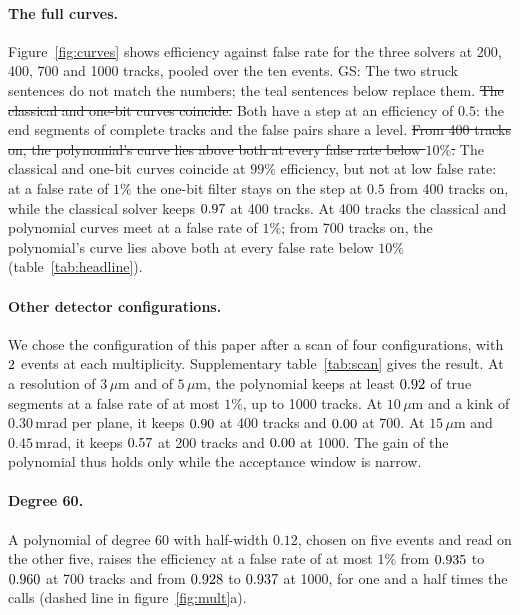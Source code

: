 \documentclass[11pt,a4paper]{article}
\newcommand{\gs}[1]{{\color{orange!85!black} GS: #1 }}
\newcommand{\gss}[1]{{\color{teal} #1}}
\newcommand{\gsx}[1]{{\color{gray}\sout{#1}}}
\begin{document}
\paragraph{The full curves.}
Figure~\ref{fig:curves} shows efficiency against false rate for the three solvers at 200, 400, 700
and 1000 tracks, pooled over the ten events. \gs{The two struck sentences do not match the numbers; the teal sentences below replace them.} \gsx{The classical and one-bit curves coincide.} Both have a
step at an efficiency of $0.5$: the end segments of complete tracks and the false pairs share a
level. \gsx{From 400 tracks on, the polynomial's curve lies above both at every false rate below $10\%$.}
\gss{The classical and one-bit curves coincide at $99\%$ efficiency, but not at low false rate: at a false rate of $1\%$ the one-bit filter stays on the step at $0.5$ from 400 tracks on, while the classical solver keeps $0.97$ at 400 tracks. At 400 tracks the classical and polynomial curves meet at a false rate of $1\%$; from 700 tracks on, the polynomial's curve lies above both at every false rate below $10\%$ (table~\ref{tab:headline}).}

\paragraph{\gss{Other detector configurations.}}
\gss{We chose the configuration of this paper after a scan of four configurations, with $2$ events at each multiplicity. Supplementary table~\ref{tab:scan} gives the result. At a resolution of $3\,\mu$m and of $5\,\mu$m, the polynomial keeps at least $0.92$ of true segments at a false rate of at most $1\%$, up to 1000 tracks. At $10\,\mu$m and a kink of $0.30$\,mrad per plane, it keeps $0.90$ at 400 tracks and $0.00$ at 700. At $15\,\mu$m and $0.45$\,mrad, it keeps $0.57$ at 200 tracks and $0.00$ at 1000. The gain of the polynomial thus holds only while the acceptance window is narrow.}

\paragraph{Degree 60.}
A polynomial of degree 60 with half-width $0.12$, chosen on five events and read on the other five,
raises the efficiency at a false rate of at most $1\%$ from $0.935$ to
$0.960$ at 700 tracks and from $0.928$ to $0.937$ at
1000, for one and a half times the calls (dashed line in figure~\ref{fig:mult}a).
\end{document}
